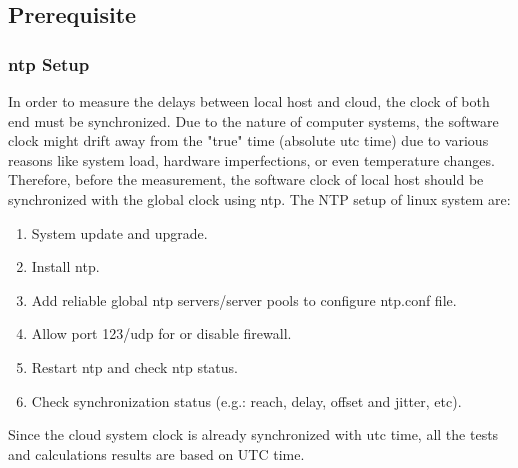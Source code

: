 \subsection{Prerequisite}
\subsubsection{\gls{ntp} Setup}
In order to measure the delays between local host and cloud, the clock of both end must be synchronized. 
Due to the nature of computer systems, the software clock might drift away from the "true" time (absolute \gls{utc} time) due to various reasons like system load, hardware imperfections, or even temperature changes.
Therefore, before the measurement, the software clock of local host should be synchronized with the global clock using \gls{ntp}. 
The NTP setup of linux system are:  

\begin{enumerate}
    \item System update and upgrade.
    \item Install \gls{ntp}.
    \item Add reliable global \gls{ntp} servers/server pools to configure ntp.conf file.
    \item Allow port 123/udp for or disable firewall.
    \item Restart \gls{ntp} and check \gls{ntp} status.
    \item Check synchronization status (e.g.: reach, delay, offset and jitter, etc).
    \end{enumerate}

Since the cloud system clock is already synchronized with \gls{utc} time, all the tests and calculations results are based on UTC time. 

